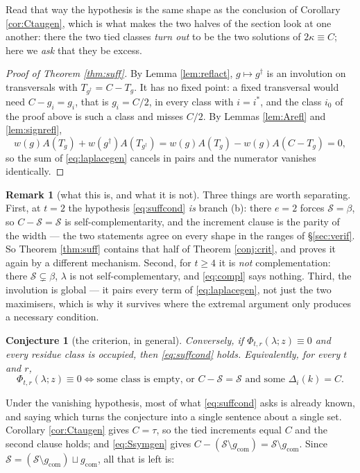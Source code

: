 \documentclass[11pt,reqno]{amsart}
\theoremstyle{plain}
\newtheorem{conjecture}[theorem]{Conjecture}
\theoremstyle{definition}
\newtheorem{remark}[theorem]{Remark}
\begin{document}
\noindent Read that way the hypothesis is the same shape as the conclusion of Corollary
\ref{cor:Ctaugen}, which is what makes the two halves of the section look at one another: there the
two tied classes \emph{turn out} to be the two solutions of $2\kappa\equiv C$; here we \emph{ask}
that they be excess.

\begin{proof}[Proof of Theorem \ref{thm:suff}]
By Lemma \ref{lem:reflact}, $g\mapsto g^{\dagger}$ is an involution on transversals with $T_{g^{\dagger}}=C-T_g$.
It has no fixed point: a fixed transversal would need $C-g_i=g_i$, that is $g_i=C/2$, in every
class with $i=i^{*}$, and the class $i_0$ of the proof above is such a class and misses $C/2$. By
Lemmas \ref{lem:Arefl} and \ref{lem:signrefl},
\[
w(g)A(T_g)+w(g^{\dagger})A(T_{g^{\dagger}})=w(g)A(T_g)-w(g)A(C-T_g)=0 ,
\]
so the sum of \eqref{eq:laplacegen} cancels in pairs and the numerator vanishes identically.
\end{proof}

\begin{remark}[what this is, and what it is not]\label{rem:suffscope}
Three things are worth separating. First, at $t=2$ the hypothesis \eqref{eq:suffcond} \emph{is}
branch {\rm(b)}: there $e=2$ forces $\mathcal{S}=\beta$, so $C-\mathcal{S}=\mathcal{S}$ is
self-complementarity, and the increment clause is the parity of the width --- the two statements
agree on every shape in the ranges of \S\ref{sec:verif}. So Theorem \ref{thm:suff} contains that
half of Theorem \ref{conj:crit}, and proves it again by a different mechanism. Second, for $t\ge4$
it is \emph{not} complementation: there $\mathcal{S}\subsetneq\beta$, $\lambda$ is not
self-complementary, and \eqref{eq:compl} says nothing. Third, the involution is global --- it pairs
every term of \eqref{eq:laplacegen}, not just the two maximisers, which is why it survives where the
extremal argument only produces a necessary condition.
\end{remark}

\begin{conjecture}[the criterion, in general]\label{conj:general}
Conversely, if $\Phi_{t,r}(\lambda;z)\equiv0$ and every residue class is occupied, then
\eqref{eq:suffcond} holds. Equivalently, for every $t$ and $r$,
\[
\Phi_{t,r}(\lambda;z)\equiv0
\iff
\text{some class is empty, or } C-\mathcal{S}=\mathcal{S}\text{ and some }\Delta_i(k)=C .
\]
\end{conjecture}

\noindent Under the vanishing hypothesis, most of what \eqref{eq:suffcond} asks is already known,
and saying which turns the conjecture into a single sentence about a single set. Corollary
\ref{cor:Ctaugen} gives $C=\tau$, so the tied increments equal $C$ and the second clause holds;
and \eqref{eq:Ssymgen} gives $C-(\mathcal{S}\setminus g_{\mathrm{com}})=\mathcal{S}\setminus
g_{\mathrm{com}}$. Since
$\mathcal{S}=(\mathcal{S}\setminus g_{\mathrm{com}})\sqcup g_{\mathrm{com}}$, all that is left is:
\end{document}
